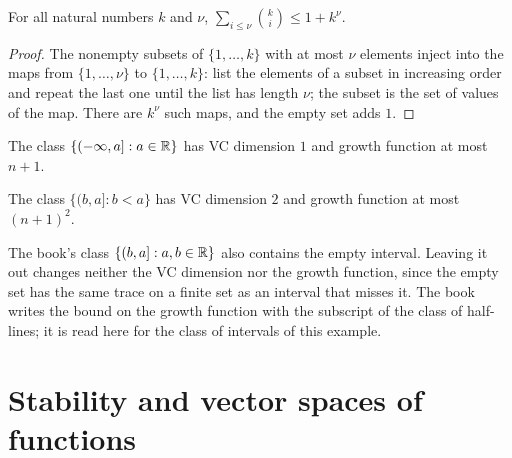 \begin{lemma}
  \label{lem:binomial-sum-bound}
  For all natural numbers $k$ and $\nu$, $\sum_{i\le\nu}\binom ki\le1+k^\nu$.
\end{lemma}
\begin{proof}
  The nonempty subsets of $\{1,\dots,k\}$ with at most $\nu$ elements inject into the maps from $\{1,\dots,\nu\}$ to $\{1,\dots,k\}$: list the elements of a subset in increasing order and repeat the last one until the list has length $\nu$; the subset is the set of values of the map. There are $k^\nu$ such maps, and the empty set adds $1$.
\end{proof}

\begin{lemma}
  \label{lem:han-ex-4-2}
  The class $\{(-\infty,a]:a\in\mathbb{R}\}$ has VC dimension $1$ and growth function at most $n+1$.
\end{lemma}

\begin{lemma}
  \label{lem:han-ex-4-3}
  The class $\{(b,a]:b<a\}$ has VC dimension $2$ and growth function at most $(n+1)^2$.
\end{lemma}
\begin{remark}
  The book's class $\{(b,a]:a,b\in\mathbb{R}\}$ also contains the empty interval. Leaving it out changes neither the VC dimension nor the growth function, since the empty set has the same trace on a finite set as an interval that misses it. The book writes the bound on the growth function with the subscript of the class of half-lines; it is read here for the class of intervals of this example.
\end{remark}

\section{Stability and vector spaces of functions}

